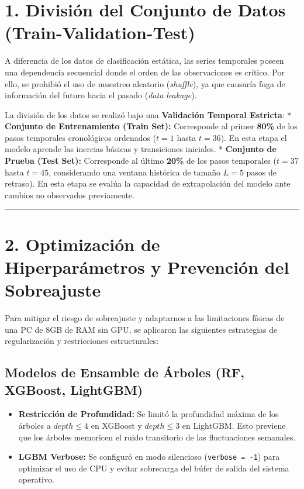 \documentclass[
  spanish,
  12pt,
]{report}
\providecommand{\tightlist}{%
  \setlength{\itemsep}{0pt}\setlength{\parskip}{0pt}}
\begin{document}
\section{1. División del Conjunto de Datos
(Train-Validation-Test)}\label{divisiuxf3n-del-conjunto-de-datos-train-validation-test}

A diferencia de los datos de clasificación estática, las series
temporales poseen una dependencia secuencial donde el orden de las
observaciones es crítico. Por ello, se prohibió el uso de muestreo
aleatorio (\emph{shuffle}), ya que causaría fuga de información del
futuro hacia el pasado (\emph{data leakage}).

La división de los datos se realizó bajo una \textbf{Validación Temporal
Estricta}: * \textbf{Conjunto de Entrenamiento (Train Set):} Corresponde
al primer \textbf{80\%} de los pasos temporales cronológicos ordenados
(\(t = 1\) hasta \(t = 36\)). En esta etapa el modelo aprende las
inercias básicas y transiciones iniciales. * \textbf{Conjunto de Prueba
(Test Set):} Corresponde al último \textbf{20\%} de los pasos temporales
(\(t = 37\) hasta \(t = 45\), considerando una ventana histórica de
tamaño \(L = 5\) pasos de retraso). En esta etapa se evalúa la capacidad
de extrapolación del modelo ante cambios no observados previamente.

\begin{center}\rule{0.5\linewidth}{0.5pt}\end{center}

\section{2. Optimización de Hiperparámetros y Prevención del
Sobreajuste}\label{optimizaciuxf3n-de-hiperparuxe1metros-y-prevenciuxf3n-del-sobreajuste}

Para mitigar el riesgo de sobreajuste y adaptarnos a las limitaciones
físicas de una PC de 8GB de RAM sin GPU, se aplicaron las siguientes
estrategias de regularización y restricciones estructurales:

\subsection{Modelos de Ensamble de Árboles (RF, XGBoost,
LightGBM)}\label{modelos-de-ensamble-de-uxe1rboles-rf-xgboost-lightgbm}

\begin{itemize}
\tightlist
\item
  \textbf{Restricción de Profundidad:} Se limitó la profundidad máxima
  de los árboles a \(depth \le 4\) en XGBoost y \(depth \le 3\) en
  LightGBM. Esto previene que los árboles memoricen el ruido transitorio
  de las fluctuaciones semanales.
\item
  \textbf{LGBM Verbose:} Se configuró en modo silencioso
  (\texttt{verbose\ =\ -1}) para optimizar el uso de CPU y evitar
  sobrecarga del búfer de salida del sistema operativo.
\end{itemize}
\end{document}
